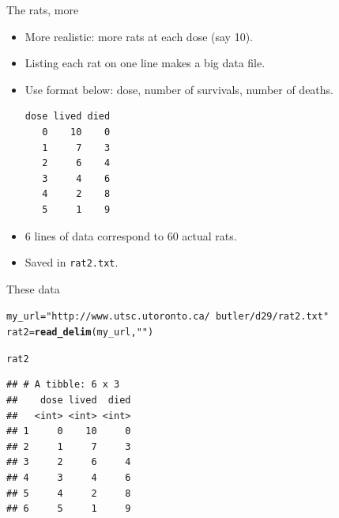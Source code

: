 \documentclass[unknownkeysallowed]{beamer}\usepackage[]{graphicx}\usepackage[]{color}
\makeatletter
\newcommand{\hlstr}[1]{\textcolor[rgb]{0.192,0.494,0.8}{#1}}%
\newcommand{\hlstd}[1]{\textcolor[rgb]{0.345,0.345,0.345}{#1}}%
\newcommand{\hlkwb}[1]{\textcolor[rgb]{0.69,0.353,0.396}{#1}}%
\newcommand{\hlkwd}[1]{\textcolor[rgb]{0.737,0.353,0.396}{\textbf{#1}}}%
\newenvironment{kframe}{%
 \def\at@end@of@kframe{}%
 \ifinner\ifhmode%
  \def\at@end@of@kframe{\end{minipage}}%
  \begin{minipage}{\columnwidth}%
 \fi\fi%
 \def\FrameCommand##1{\hskip\@totalleftmargin \hskip-\fboxsep
 \colorbox{shadecolor}{##1}\hskip-\fboxsep
     \hskip-\linewidth \hskip-\@totalleftmargin \hskip\columnwidth}%
 \MakeFramed {\advance\hsize-\width
   \@totalleftmargin\z@ \linewidth\hsize
   \@setminipage}}%
 {\par\unskip\endMakeFramed%
 \at@end@of@kframe}
\newenvironment{knitrout}{}{} %
\makeatother
\begin{document}
\begin{frame}[fragile]{The rats, more}

  \begin{itemize}
  \item More realistic: more rats at each dose (say 10).
  \item Listing each rat on one line makes a big data file.
  \item Use format below: dose, number of survivals, number of deaths.
\begin{verbatim}
dose lived died
   0    10    0
   1     7    3 
   2     6    4 
   3     4    6 
   4     2    8 
   5     1    9  
\end{verbatim}


  \item 6 lines of data correspond to 60 actual rats.

  \item Saved in \texttt{rat2.txt}.

  \end{itemize}
  
\end{frame}

\begin{frame}[fragile]{These data}

 
\begin{knitrout}\footnotesize
{}\color{fgcolor}\begin{kframe}
\begin{alltt}
\hlstd{my_url}\hlkwb{=}\hlstr{"http://www.utsc.utoronto.ca/~butler/d29/rat2.txt"}
\hlstd{rat2}\hlkwb{=}\hlkwd{read_delim}\hlstd{(my_url,}\hlstr{" "}\hlstd{)}
\end{alltt}


{\ttfamily\noindent\itshape\color{messagecolor}{\#\# Parsed with column specification:\\\#\# cols(\\\#\#\ \  dose = col\_integer(),\\\#\#\ \  lived = col\_integer(),\\\#\#\ \  died = col\_integer()\\\#\# )}}\begin{alltt}
\hlstd{rat2}
\end{alltt}
\begin{verbatim}
## # A tibble: 6 x 3
##    dose lived  died
##   <int> <int> <int>
## 1     0    10     0
## 2     1     7     3
## 3     2     6     4
## 4     3     4     6
## 5     4     2     8
## 6     5     1     9
\end{verbatim}
\end{kframe}
\end{knitrout}
  


  
\end{frame}
\end{document}
